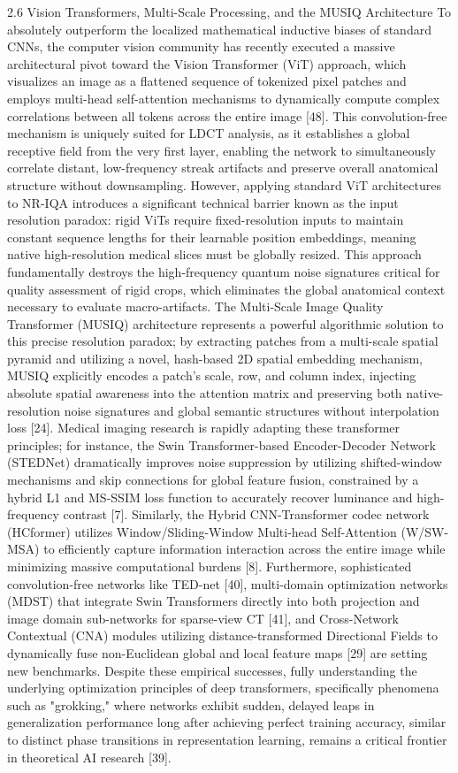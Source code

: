 2.6 Vision Transformers, Multi-Scale Processing, and the MUSIQ Architecture To absolutely outperform the localized mathematical inductive biases of standard CNNs, the computer vision community has recently executed a massive architectural pivot toward the Vision Transformer (ViT) approach, which visualizes an image as a flattened sequence of tokenized pixel patches and employs multi-head self-attention mechanisms to dynamically compute complex correlations between all tokens across the entire image [48]. This convolution-free mechanism is uniquely suited for LDCT analysis, as it establishes a global receptive field from the very first layer, enabling the network to simultaneously correlate distant, low-frequency streak artifacts and preserve overall anatomical structure without downsampling. However, applying standard ViT architectures to NR-IQA introduces a significant technical barrier known as the input resolution paradox: rigid ViTs require fixed-resolution inputs to maintain constant sequence lengths for their learnable position embeddings, meaning native high-resolution medical slices must be globally resized. This approach fundamentally destroys the high-frequency quantum noise signatures critical for quality assessment of rigid crops, which eliminates the global anatomical context necessary to evaluate macro-artifacts. The Multi-Scale Image Quality Transformer (MUSIQ) architecture represents a powerful algorithmic solution to this precise resolution paradox; by extracting patches from a multi-scale spatial pyramid and utilizing a novel, hash-based 2D spatial embedding mechanism, MUSIQ explicitly encodes a patch's scale, row, and column index, injecting absolute spatial awareness into the attention matrix and preserving both native-resolution noise signatures and global semantic structures without interpolation loss [24]. Medical imaging research is rapidly adapting these transformer principles; for instance, the Swin Transformer-based Encoder-Decoder Network (STEDNet) dramatically improves noise suppression by utilizing shifted-window mechanisms and skip connections for global feature fusion, constrained by a hybrid L1 and MS-SSIM loss function to accurately recover luminance and high-frequency contrast [7]. Similarly, the Hybrid CNN-Transformer codec network (HCformer) utilizes Window/Sliding-Window Multi-head Self-Attention (W/SW-MSA) to efficiently capture information interaction across the entire image while minimizing massive computational burdens [8]. Furthermore, sophisticated convolution-free networks like TED-net [40], multi-domain optimization networks (MDST) that integrate Swin Transformers directly into both projection and image domain sub-networks for sparse-view CT [41], and Cross-Network Contextual (CNA) modules utilizing distance-transformed Directional Fields to dynamically fuse non-Euclidean global and local feature maps [29] are setting new benchmarks. Despite these empirical successes, fully understanding the underlying optimization principles of deep transformers, specifically phenomena such as "grokking," where networks exhibit sudden, delayed leaps in generalization performance long after achieving perfect training accuracy, similar to distinct phase transitions in representation learning, remains a critical frontier in theoretical AI research [39].
